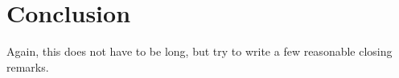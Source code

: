 \section{Conclusion}\label{sec:conclusion}
Again, this does not have to be long, but try to write a few reasonable closing remarks.